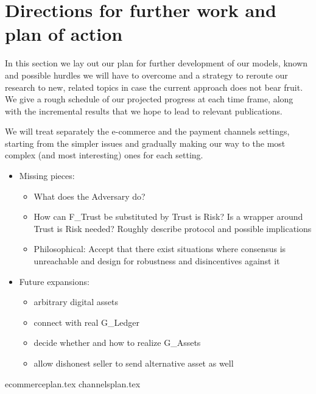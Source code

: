 \section{Directions for further work and plan of action}
\label{sec:plan}
  In this section we lay out our plan for further development of our models, known and
  possible hurdles we will have to overcome and a strategy to reroute our research to new,
  related topics in case the current approach does not bear fruit. We give a rough
  schedule of our projected progress at each time frame, along with the incremental
  results that we hope to lead to relevant publications.

  We will treat separately the e-commerce and the payment channels settings, starting from
  the simpler issues and gradually making our way to the most complex (and most
  interesting) ones for each setting.
  \begin{itemize}
    \item Missing pieces:
    \begin{itemize}
      \item What does the Adversary do?
      \item How can F\_Trust be substituted by Trust is Risk? Is a wrapper around Trust is
      Risk needed? Roughly describe protocol and possible implications
      \item Philosophical: Accept that there exist situations where consensus is
      unreachable and design for robustness and disincentives against it
    \end{itemize}
    \item Future expansions:
    \begin{itemize}
      \item arbitrary digital assets
      \item connect with real G\_Ledger
      \item decide whether and how to realize G\_Assets
      \item allow dishonest seller to send alternative asset as well
    \end{itemize}
  \end{itemize}

  {ecommerceplan.tex}
  {channelsplan.tex}
